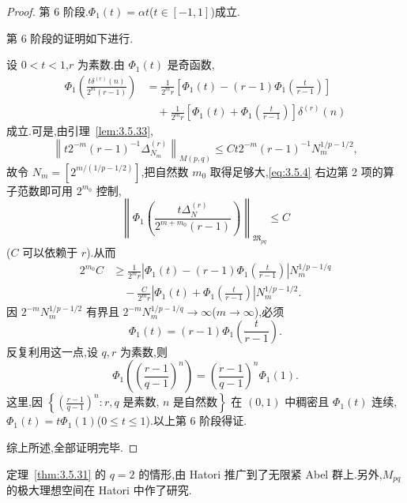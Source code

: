 \begin{proof}
第 6 阶段.$\Phi_1(t) = \alpha t$($t\in [-1,1]$)成立.

第 6 阶段的证明如下进行.

设 $0 < t < 1$,$r$ 为素数.由 $\Phi_{1}(t)$ 是奇函数,
\begin{equation}\tag{3.5.4}\begin{aligned}
\Phi_{1}\left(\frac{t\delta^{(r)}(n)}{2^{m}(r-1)}\right) &= \frac{1}{2^{m}r}\left[\Phi_{1}(t) - (r-1)\Phi_{1}\left(\frac{t}{r-1}\right)\right]\\
&\quad + \frac{1}{2^{m}r}\left[\Phi_{1}(t) + \Phi_{1}\left(\frac{t}{r-1}\right)\right]\delta^{(r)}(n)
\end{aligned}\label{eq:3.5.4}\end{equation}
成立.可是,由引理~\ref{lem:3.5.33},
\begin{equation*}
\left\|t2^{-m}(r-1)^{-1}\Delta_{N_{m}}^{(r)}\right\|_{M(p,q)} \leq Ct2^{-m}(r-1)^{-1}N_{m}^{1/p - 1/2},
\end{equation*}
故令 $N_{m} = [2^{m/(1/p-1/2)}]$,把自然数 $m_{0}$ 取得足够大,\eqref{eq:3.5.4} 右边第 2 项的算子范数即可用 $2^{m_{0}}$ 控制,
\begin{equation*}
\left\|\Phi_{1}\left(\frac{t\Delta_{N}^{(r)}}{2^{m+m_{0}}(r-1)}\right)\right\|_{\mathfrak{M}_{pq}} \leq C
\end{equation*}
($C$ 可以依赖于 $r$).从而
\begin{align*}
2^{m_{0}}C &\geq \frac{1}{2^{m}r}\left|\Phi_{1}(t) - (r-1)\Phi_{1}\left(\frac{t}{r-1}\right)\right|N_{m}^{1/p - 1/q}\\
&\quad - \frac{C}{2^{m}r}\left|\Phi_{1}(t) + \Phi_{1}\left(\frac{t}{r-1}\right)\right|N_{m}^{1/p - 1/2}.
\end{align*}
因 $2^{-m}N_{m}^{1/p-1/2}$ 有界且 $2^{-m}N_{m}^{1/p-1/q}\to\infty$($m\to\infty$),必须
\begin{equation*}
\Phi_{1}(t) = (r-1)\Phi_{1}\left(\frac{t}{r-1}\right).
\end{equation*}
反复利用这一点,设 $q, r$ 为素数,则
\begin{equation*}
\Phi_{1}\left(\left(\frac{r-1}{q-1}\right)^{n}\right) = \left(\frac{r-1}{q-1}\right)^{n}\Phi_{1}(1).
\end{equation*}
这里,因 $\left\{(\frac{r-1}{q-1})^{n}: r, q \text{ 是素数, } n \text{ 是自然数}\right\}$ 在 $(0, 1)$ 中稠密且 $\Phi_{1}(t)$ 连续,$\Phi_{1}(t)=t\Phi_{1}(1)$($0\leq t\leq1$).以上第 6 阶段得证.

综上所述,全部证明完毕.
\end{proof}

\begin{note}\label{note:3.5.34}
定理~\ref{thm:3.5.31} 的 $q = 2$ 的情形,由 Hatori \cite{ch3:19} 推广到了无限紧 Abel 群上.另外,$M_{pq}$ 的极大理想空间在 Hatori \cite{ch3:20} 中作了研究.
\end{note}

